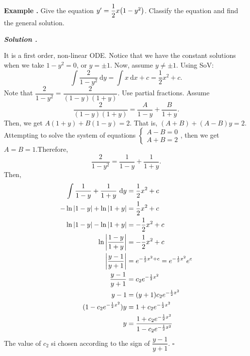\documentclass[12pt, a4paper]{article}
\newcounter{index}[subsection]
\newenvironment*{eg}{\begin{framed}\par\noindent\textbf{Example \thesubsection.\stepcounter{index}\theindex}}{\par\end{framed}}
\newcounter{nprf}[subsection]
\newenvironment*{sol}{\par\indent\textbf{\textit{Solution \stepcounter{nprf}\thenprf.}}\par}{\hfill{$\square$}\par}
\def\d{{\mathrm{d}}}
\def\A{\vb A}
\begin{document}
\begin{eg}
	Give the equation $y'=\dfrac{1}{2}x\qty(1-y^2)$. Classify the equation and find the general solution. 
	\begin{sol}
		It is a first order, non-linear ODE. Notice that we have the constant solutions when we take $1-y^2=0$, or $y=\pm1$. Now, assume $y\neq\pm1$. Using SoV: \[\int\dfrac{2}{1-y^2}\ \d{y}=\int x\ \d{x}+c=\dfrac{1}{2}x^2+c.\]	Note that $\dfrac{2}{1-y^2}=\dfrac{2}{(1-y)(1+y)}$. Use partial fractions. Assume \[\dfrac{2}{(1-y)(1+y)}=\dfrac{A}{1-y}+\dfrac{B}{1+y}.\] Then, we get $A(1+y)+B(1-y)=2$. That is, $(A+B)+(A-B)y=2$. Attempting to solve the system of equations $\begin{cases}A-B=0\\A+B=2\end{cases}$, then we get $A=B=1$.Therefore, \[\dfrac{2}{1-y^2}=\dfrac{1}{1-y}+\dfrac{1}{1+y}.\] Then, \[\begin{aligned}\int\dfrac{1}{1-y}+\dfrac{1}{1+y}\ \d{y}&=\dfrac{1}{2}x^2+c\\-\ln\qty|1-y|+\ln\qty|1+y|&=\dfrac{1}{2}x^2+c\\\ln\qty|1-y|-\ln\qty|1+y|&=-\dfrac{1}{2}x^2+c\\\ln\qty|\dfrac{1-y}{1+y}|&=-\dfrac{1}{2}x^2+c\\\qty|\dfrac{y-1}{y+1}|&=e^{-\frac{1}{2}x^2+c}=e^{-\frac{1}{2}x^2}e^c\\\dfrac{y-1}{y+1}&=c_2e^{-\frac{1}{2}x^2}\\y-1&=(y+1)c_2e^{-\frac{1}{2}x^2}\\(1-c_2e^{-\frac{1}{2}x^2})y&=1+c_2e^{-\frac{1}{2}x^2}\\y&=\dfrac{1+c_2e^{-\frac{1}{2}x^2}}{1-c_2e^{-\frac{1}{2}x^2}}\end{aligned}\] The value of $c_2$ si chosen according to the sign of $\dfrac{y-1}{y+1}.$
	\end{sol}
\end{eg}
\end{document}
